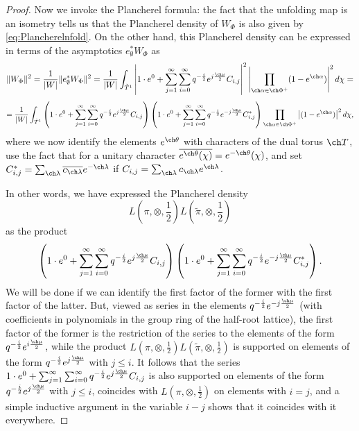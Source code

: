 \begin{proof}
Now we invoke the Plancherel formula: the fact that the unfolding map is an isometry tells us that the Plancherel density of $W_{\Phi}$ is also given by \eqref{eq:Plancherelnfold}. On the other hand, this Plancherel density can be expressed in terms of the asymptotics
$e_\emptyset^* W_{\Phi}$ as
\[ \Vert W_{\Phi}\Vert^2 = \frac{1}{|W|} \Vert e_\emptyset^* W_{\Phi}\Vert^2 = \frac{1}{|W|} \int_{\check T^1}
\left|1\cdot e^0 + \sum_{j=1}^\infty \sum_{i=0}^\infty q^{-\frac{i}{2}} e^{j\frac{\ch\mu}{2}} C_{i,j}\right|^2 \left| \prod_{\ch\alpha \in \ch\Phi^+} (1-e^{\ch\alpha})\right|^2 d\chi = \]
\[ = \frac{1}{|W|} \int_{\check T^1}
\left(1\cdot e^0 + \sum_{j=1}^\infty \sum_{i=0}^\infty q^{-\frac{i}{2}} e^{j\frac{\ch\mu}{2}} C_{i,j}\right) \left(1\cdot e^0 + \sum_{j=1}^\infty \sum_{i=0}^\infty q^{-\frac{i}{2}} e^{-j\frac{\ch\mu}{2}} C^*_{i,j}\right) \prod_{\ch\alpha \in \ch\Phi^+} \left|(1-e^{\ch\alpha})\right|^2 d\chi,\]
where we now identify the elements $e^{\ch\theta}$ with characters of the dual torus $\ch T$, use the fact that for a unitary character $\overline{e^{\ch\theta}(\chi)} = e^{-\ch\theta}(\chi)$, and set $C^*_{i,j} = \sum_{\ch\lambda} \overline{c_{\ch\lambda}} e^{-\ch\lambda}$ if $C_{i,j} = \sum_{\ch\lambda} c_{\ch\lambda} e^{\ch\lambda} $.

In other words, we have expressed the Plancherel density
\[
 L(\pi, \otimes, \frac{1}{2}) L(\tilde \pi, \otimes, \frac{1}{2})
\]
as the product
\[
 \left(1\cdot e^0 + \sum_{j=1}^\infty \sum_{i=0}^\infty q^{-\frac{i}{2}} e^{j\frac{\ch\mu}{2}} C_{i,j}\right) \left(1\cdot e^0 + \sum_{j=1}^\infty \sum_{i=0}^\infty q^{-\frac{i}{2}} e^{-j\frac{\ch\mu}{2}} C^*_{i,j}\right).
\]
We will be done if we can identify the first factor of the former with the first factor of the latter. But, viewed as series in the elements $q^{-\frac{i}{2}} e^{-j\frac{\ch\mu}{2}}$ (with coefficients in polynomials in the group ring of the half-root lattice), the first factor of the former is the restriction of the series to the elements of the form $q^{-\frac{i}{2}} e^{i\frac{\ch\mu}{2}}$, while the product
$ L(\pi, \otimes, \frac{1}{2}) L(\tilde \pi, \otimes, \frac{1}{2})$ is supported on elements of the form $q^{-\frac{i}{2}} e^{j\frac{\ch\mu}{2}}$ with $j\le i$. It follows that the series $ 1\cdot e^0 + \sum_{j=1}^\infty \sum_{i=0}^\infty q^{-\frac{i}{2}} e^{j\frac{\ch\mu}{2}} C_{i,j}$ is also supported on elements of the form $q^{-\frac{i}{2}} e^{j\frac{\ch\mu}{2}}$ with $j \le i$, coincides with $L(\pi, \otimes, \frac{1}{2})$ on elements with $i=j$, and a simple inductive argument in the variable $i-j$ shows that it coincides with it everywhere.
\end{proof}



\appendix
